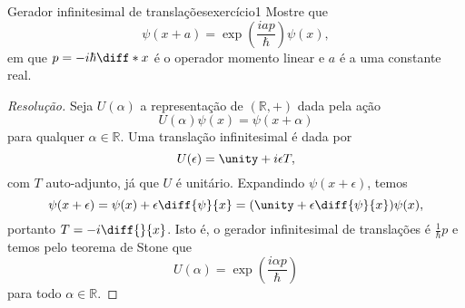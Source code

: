 \begin{exercício}{Gerador infinitesimal de translações}{exercício1}
    Mostre que
    \begin{equation*}
        \psi(x + a) = \exp\left(\frac{i a p}{\hbar}\right)\psi(x),
    \end{equation*}
    em que \(p = -i\hbar \diff*{}{x}\) é o operador momento linear e \(a\) é a uma constante real.
\end{exercício}
\begin{proof}[Resolução]
    Seja \(U(\alpha)\) a representação de \((\mathbb{R},+)\) dada pela ação
    \begin{equation*}
        U(\alpha)\psi(x) = \psi(x + \alpha)
    \end{equation*}
    para qualquer \(\alpha \in \mathbb{R}\). Uma translação infinitesimal é dada por
    \begin{equation*}
        U(\epsilon) = \unity + i \epsilon T,
    \end{equation*}
    com \(T\) auto-adjunto, já que \(U\) é unitário. Expandindo \(\psi(x + \epsilon)\), temos
    \begin{equation*}
        \psi(x + \epsilon) = \psi(x) + \epsilon \diff{\psi}{x} = (\unity + \epsilon\diff{\psi}{x})\psi(x),
    \end{equation*}
    portanto \(T = -i \diff{}{x}\). Isto é, o gerador infinitesimal de translações é \(\frac1{\hbar}p\) e temos pelo teorema de Stone que
    \begin{equation*}
        U(\alpha) = \exp\left(\frac{i \alpha p}{\hbar}\right)
    \end{equation*}
    para todo \(\alpha \in \mathbb{R}\).
\end{proof}
